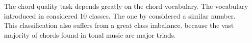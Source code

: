 
The chord quality task depends greatly on the chord
vocabulary. The vocabulary introduced in
\textcite{chen2018functional} considered 10 classes. The one by \textcite{micchi2020not} considered a
similar number. This classification also suffers from a
great class imbalance, because the vast majority of chords
found in tonal music are major triads.
